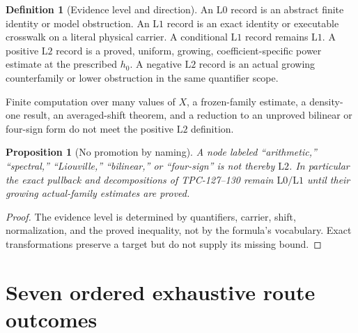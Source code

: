 \documentclass[11pt]{article}
\newtheorem{proposition}[theorem]{Proposition}
\theoremstyle{definition}
\newtheorem{definition}[theorem]{Definition}
\theoremstyle{remark}
\newcommand{\Lzero}{\mathrm{L0}}
\newcommand{\Lone}{\mathrm{L1}}
\newcommand{\Ltwo}{\mathrm{L2}}
\begin{document}
\begin{definition}[Evidence level and direction]
\label{def:level}
An \(\Lzero\) record is an abstract finite identity or model
obstruction.  An \(\Lone\) record is an exact identity or executable
crosswalk on a literal physical carrier.  A conditional \(\Lone\)
record remains \(\Lone\).  A positive \(\Ltwo\) record is a proved,
uniform, growing, coefficient-specific power estimate at the
prescribed \(h_0\).  A negative \(\Ltwo\) record is an actual growing
counterfamily or lower obstruction in the same quantifier scope.
\end{definition}

Finite computation over many values of \(X\), a frozen-family
estimate, a density-one result, an averaged-shift theorem, and a
reduction to an unproved bilinear or four-sign form do not meet the
positive \(\Ltwo\) definition.

\begin{proposition}[No promotion by naming]
\label{prop:nopromotion}
A node labeled ``arithmetic,'' ``spectral,'' ``Liouville,''
``bilinear,'' or ``four-sign'' is not thereby \(\Ltwo\).  In
particular the exact
pullback and decompositions of TPC-127--130 remain \(\Lzero/\Lone\)
until their growing actual-family estimates are proved.
\end{proposition}

\begin{proof}
The evidence level is determined by quantifiers, carrier, shift,
normalization, and the proved inequality, not by the formula's
vocabulary.  Exact transformations preserve a target but do not
supply its missing bound.
\end{proof}

\section{Seven ordered exhaustive route outcomes}
\end{document}
